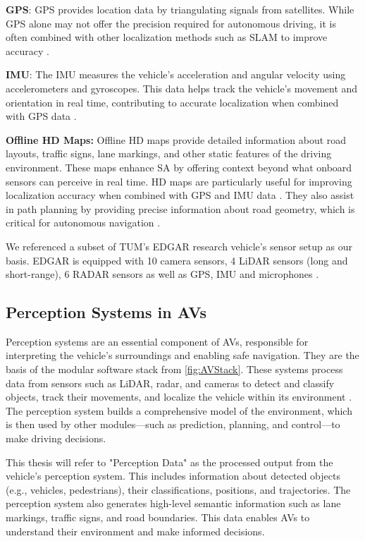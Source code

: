     \textbf{\ac{GPS}}:
    \ac{GPS} provides location data by triangulating signals from satellites. While GPS alone may not offer the precision
    required for autonomous driving, it is often combined with other localization methods such as \ac{SLAM}
    to improve accuracy \cite{thrun2005slam}.

    \textbf{\ac{IMU}}:
    The \ac{IMU} measures the vehicle's acceleration and angular velocity using accelerometers and gyroscopes.
    This data helps track the vehicle's movement and orientation in real time, contributing to accurate
    localization when combined with GPS data \cite{madgwick2011imu}.

    \textbf{Offline HD Maps:}
    Offline HD maps provide detailed information about road layouts, traffic signs, lane markings, and other static features of the driving environment. These maps enhance \ac{SA} by offering context beyond what onboard sensors can perceive in real time. HD maps are particularly useful for improving localization accuracy when combined with GPS and IMU data \cite{bansal2018hdmaps}. They also assist in path planning by providing precise information about road geometry, which is critical for autonomous navigation \cite{zhu2021hdmaps}.

We referenced a subset of TUM's EDGAR research vehicle's sensor setup as our basis.
EDGAR is equipped with 10 camera sensors, 4 \ac{LiDAR} sensors (long and short-range), 6 RADAR sensors as well as \ac{GPS}, \ac{IMU} and microphones \cite{tum2023edgar}.

\subsection{Perception Systems in \acp{AV}}
Perception systems are an essential component of \acp{AV}, responsible for interpreting the
vehicle's surroundings and enabling safe navigation. They are the basis of the modular software stack from \ref{fig:AVStack}.
These systems process data from sensors such as \ac{LiDAR},
radar, and cameras to detect and classify objects, track their movements, and localize the vehicle within
its environment \cite{liu2018perception}. The perception system builds a comprehensive model of the environment,
which is then used by other modules—such as prediction, planning, and control—to make driving decisions.

This thesis will refer to "Perception Data" as the processed output from the vehicle's perception system. This includes information about detected objects (e.g., vehicles, pedestrians), their classifications, positions, and trajectories. The perception system also generates high-level semantic information such as lane markings, traffic signs, and road boundaries. This data enables \acp{AV} to understand their environment and make informed decisions.

